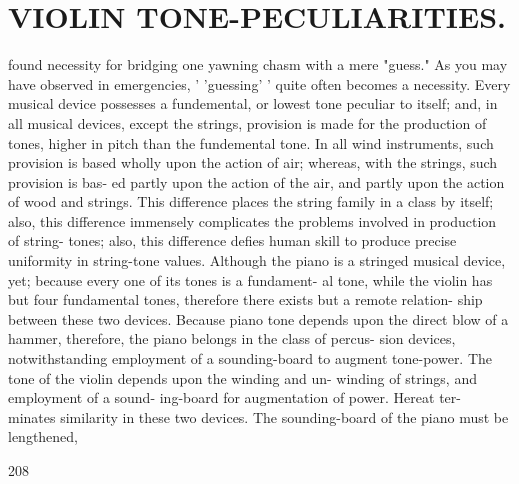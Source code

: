 \documentclass{article}
\begin{document}
\section*{VIOLIN TONE-PECULIARITIES.}
found necessity for bridging one yawning chasm with a mere "guess." As you may have observed in emergencies, ' 'guessing' ' quite often becomes a necessity. Every musical device possesses a fundemental, or lowest tone peculiar to itself; and, in all musical devices, except the strings, provision is made for the production of tones, higher in pitch than the fundemental tone. In all wind instruments, such provision is based wholly upon the action of air; whereas, with the strings, such provision is bas- ed partly upon the action of the air, and partly upon the action of wood and strings. This difference places the string family in a class by itself; also, this difference immensely complicates the problems involved in production of string- tones; also, this difference defies human skill to produce precise uniformity in string-tone values. Although the piano is a stringed musical device, yet; because every one of its tones is a fundament- al tone, while the violin has but four fundamental tones, therefore there exists but a remote relation- ship between these two devices. Because piano tone depends upon the direct blow of a hammer, therefore, the piano belongs in the class of percus- sion devices, notwithstanding employment of a sounding-board to augment tone-power. The tone of the violin depends upon the winding and un- winding of strings, and employment of a sound- ing-board for augmentation of power. Hereat ter- minates similarity in these two devices. The sounding-board of the piano must be lengthened,

208
\end{document}
